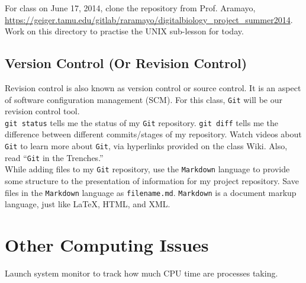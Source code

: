 For class on June 17, 2014, clone the repository from Prof. Aramayo, \url{https://geiger.tamu.edu/gitlab/raramayo/digitalbiology_project_summer2014}. Work on this directory to practise the UNIX sub-lesson for today.






\subsection{Version Control (Or Revision Control)}
\label{ssec:Version Control}

Revision control is also known as version control or source control. It is an aspect of software configuration management (SCM). For this class, {\tt Git} \cite{Chacon2009,Swicegood2010,Humble2011,VibrantPublishers2012b,Fox2013} will be our revision control tool. \\

{\tt git status} tells me the status of my {\tt Git} repository. {\tt git diff} tells me the difference between different commits/stages of my repository. Watch videos about {\tt Git} to learn more about {\tt Git}, via hyperlinks provided on the class Wiki. Also, read ``{\tt Git} in the Trenches.'' \\

While adding files to my {\tt Git} repository, use the {\tt Markdown} language to provide some structure to the presentation of information for my project repository. Save files in the {\tt Markdown} language as {\tt filename.md}. {\tt Markdown} is a document markup language, just like \LaTeX, HTML, and XML. \\

\section{Other Computing Issues}
\label{sec:OtherComputingIssues}




Launch system monitor to track how much CPU time are processes taking. 





















